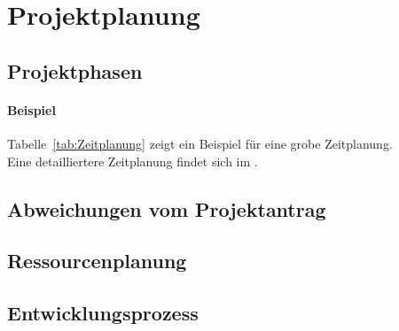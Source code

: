 \section{Projektplanung} 
\label{sec:Projektplanung}


\subsection{Projektphasen}
\label{sec:Projektphasen}


\paragraph{Beispiel}
Tabelle~\ref{tab:Zeitplanung} zeigt ein Beispiel für eine grobe Zeitplanung.
\\
Eine detailliertere Zeitplanung findet sich im .

\subsection{Abweichungen vom Projektantrag}
\label{sec:AbweichungenProjektantrag}


\subsection{Ressourcenplanung}
\label{sec:Ressourcenplanung}


\subsection{Entwicklungsprozess}
\label{sec:Entwicklungsprozess}

